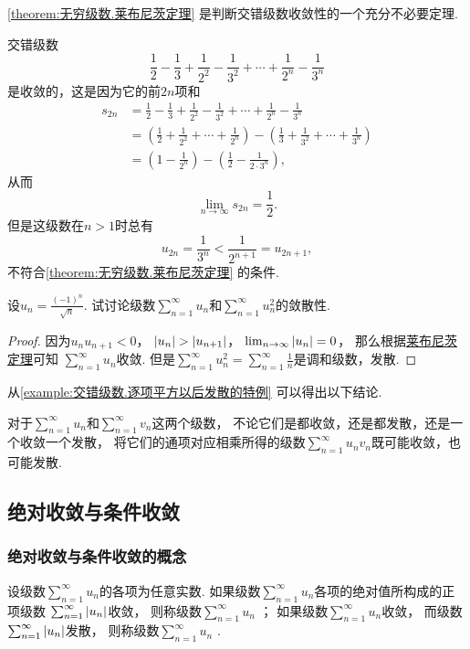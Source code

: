 \cref{theorem:无穷级数.莱布尼茨定理} 是判断交错级数收敛性的一个充分不必要定理.
\begin{example}
交错级数\[
\frac{1}{2} - \frac{1}{3}
+ \frac{1}{2^2} - \frac{1}{3^2}
+ \dotsm + \frac{1}{2^n} - \frac{1}{3^n}
\]是收敛的，这是因为它的前\(2n\)项和\begin{align*}
s_{2n} &= \frac{1}{2} - \frac{1}{3}
+ \frac{1}{2^2} - \frac{1}{3^2}
+ \dotsm + \frac{1}{2^n} - \frac{1}{3^n} \\
&= \left(\frac{1}{2} + \frac{1}{2^2} + \dotsm + \frac{1}{2^n}\right)
 - \left(\frac{1}{3} + \frac{1}{3^2} + \dotsm + \frac{1}{3^n}\right) \\
&= \left(1 - \frac{1}{2^n}\right)
 - \left(\frac{1}{2} - \frac{1}{2\cdot3^n}\right),
\end{align*}从而\[
\lim_{n\to\infty} s_{2n} = \frac{1}{2}.
\]但是这级数在\(n>1\)时总有\[
u_{2n} = \frac{1}{3^n} < \frac{1}{2^{n+1}} = u_{2n+1},
\]不符合\cref{theorem:无穷级数.莱布尼茨定理} 的条件.
\end{example}

\begin{example}\label{example:交错级数.逐项平方以后发散的特例}
设\(u_n = \frac{(-1)^n}{\sqrt{n}}\).
试讨论级数\(\sum_{n=1}^\infty u_n\)和\(\sum_{n=1}^\infty u_n^2\)的敛散性.
\begin{proof}
因为\(u_n u_{n+1} < 0\)，
\(\abs{u_n} > \abs{u_{n+1}}\)，
\(\lim_{n\to\infty} \abs{u_n} = 0\)，
那么根据\hyperref[theorem:无穷级数.莱布尼茨定理]{莱布尼茨定理}可知
\(\sum_{n=1}^\infty u_n\)收敛.
但是\(\sum_{n=1}^\infty u_n^2
= \sum_{n=1}^\infty \frac{1}{n}\)是调和级数，发散.
\end{proof}
\end{example}

从\cref{example:交错级数.逐项平方以后发散的特例} 可以得出以下结论.
\begin{proposition}
对于\(\sum_{n=1}^\infty u_n\)和\(\sum_{n=1}^\infty v_n\)这两个级数，
不论它们是都收敛，还是都发散，还是一个收敛一个发散，
将它们的通项对应相乘所得的级数\(\sum_{n=1}^\infty u_n v_n\)既可能收敛，也可能发散.
\end{proposition}

\subsection{绝对收敛与条件收敛}
\subsubsection{绝对收敛与条件收敛的概念}
\begin{definition}
设级数\(\sum_{n=1}^\infty u_n\)的各项为任意实数.
如果级数\(\sum_{n=1}^\infty u_n\)各项的绝对值所构成的正项级数
\(\sum_{n=1}^\infty \abs{u_n}\)收敛，
则称级数\(\sum_{n=1}^\infty u_n\) ；
如果级数\(\sum_{n=1}^\infty u_n\)收敛，
而级数\(\sum_{n=1}^\infty \abs{u_n}\)发散，
则称级数\(\sum_{n=1}^\infty u_n\) .
\end{definition}


